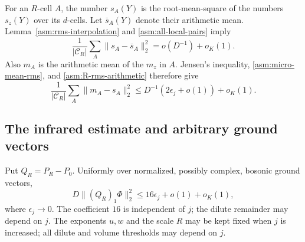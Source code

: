For an $R$-cell $A$, the number $s_A(Y)$ is the root-mean-square of
the numbers $s_z(Y)$ over its $d$-cells. Let $\overline s_A(Y)$ denote
their arithmetic mean. Lemma~\ref{asm:rms-interpolation} and
\eqref{asm:all-local-pairs} imply
\begin{equation}\label{asm:R-rms-arithmetic}
 \frac1{|\mathcal C_R|}\sum_A\|s_A-\overline s_A\|_2^2
           =o(D^{-1})+o_K(1).
\end{equation}
Also $m_A$ is the arithmetic mean of the $m_z$ in $A$. Jensen's
inequality, \eqref{asm:micro-mean-rms}, and
\eqref{asm:R-rms-arithmetic} therefore give
\begin{equation}\label{asm:R-mean-rms}
 \frac1{|\mathcal C_R|}\sum_A\|m_A-s_A\|_2^2
       \le D^{-1}(2\epsilon_j+o(1))+o_K(1).
\end{equation}

\subsection{The infrared estimate and arbitrary ground vectors}

\begin{proposition}\label{asm:infrared}
Put $Q_R=P_R-P_0$. Uniformly over normalized, possibly complex,
bosonic ground vectors,
\begin{equation}\label{asm:infrared-bound}
 D\|(Q_R)_1\Phi\|_2^2\le16\epsilon_j+o(1)+o_K(1),
\end{equation}
where $\epsilon_j\to0$. The coefficient $16$ is independent of $j$;
the dilute remainder may depend on $j$. The exponents $u,w$ and the scale $R$ may be
kept fixed when $j$ is increased; all dilute and volume thresholds may
depend on $j$.
\end{proposition}

